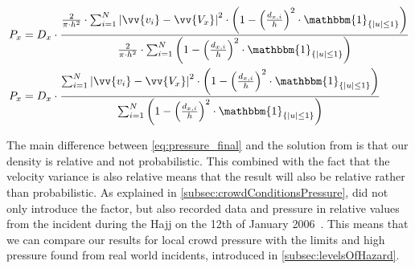 \begin{equation}
\label{eq:pressure_final}
\begin{split}
P_x &= D_x \cdot \frac{\frac{2}{\pi \cdot h^2} \cdot \sum_{i=1}^{N} \left|\vv{v_i} - \vv{V_x}\right|^2 \cdot \left(1-\left(\frac{d_{x,i}}{h}\right)^2 \cdot \mathbbm{1}_{\{|u| \leq 1\} }\right)}{\frac{2}{\pi \cdot h^2} \cdot \sum_{i=1}^{N} \left(1-\left(\frac{d_{x,i}}{h}\right)^2 \cdot \mathbbm{1}_{\{|u| \leq 1\} }\right)}\\
%
%
P_x &= D_x \cdot \frac{\sum_{i=1}^{N} \left|\vv{v_i} - \vv{V_x}\right|^2 \cdot \left(1-\left(\frac{d_{x,i}}{h}\right)^2 \cdot \mathbbm{1}_{\{|u| \leq 1\} }\right)}{\sum_{i=1}^{N} \left(1-\left(\frac{d_{x,i}}{h}\right)^2 \cdot \mathbbm{1}_{\{|u| \leq 1\} }\right)}
\end{split}
\end{equation}

The main difference between \cref{eq:pressure_final} and the solution from \citet{wirz2012inferring} is that our density is relative and not probabilistic. This combined with the fact that the velocity variance is also relative means that the result will also be relative rather than probabilistic. As explained in \cref{subsec:crowdConditionsPressure}, \citet{empircalstudy} did not only introduce the factor, but also recorded data and pressure in relative values from the incident during the Hajj on the 12th of January 2006~\cite{website:Wikipedia-Hajj}. This means that we can compare our results for local crowd pressure with the limits and high pressure found from real world incidents, introduced in \cref{subsec:levelsOfHazard}.

